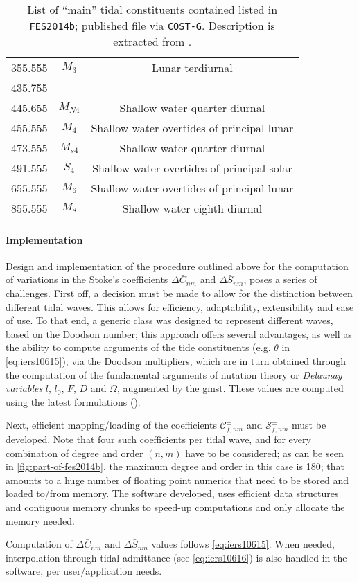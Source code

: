 \begin{table}[]
\begin{tabular}{ccc}
      355.555 & $M_3$ & Lunar terdiurnal \\
      435.755 & & \\
      445.655 & $M_{N4}$ & Shallow water quarter diurnal \\
      455.555 & $M_4$ & Shallow water overtides of principal lunar \\
      473.555 & $M_{s4}$ & Shallow water quarter diurnal \\
      491.555 & $S_4$ & Shallow water overtides of principal solar \\
      655.555 & $M_6$ & Shallow water overtides of principal lunar \\
      855.555 & $M_8$ & Shallow water eighth diurnal\\
      \hline
  \end{tabular}
  \caption{List of ``main'' tidal constituents contained listed in \texttt{FES2014b}; published 
    file via \texttt{COST-G}. Description is extracted from \cite{Beauducel2023}.}
  \label{table:tidal-constituents-fes14b}
\end{table}

\paragraph{Implementation}\label{par:ocean-tide-acceleration-implementation}
Design and implementation of the procedure outlined above for the computation of 
variations in the Stoke's coefficients $\Delta \bar{C}_{nm}$ and $\Delta \bar{S}_{nm}$, 
poses a series of challenges. First off, a decision must be made to allow for the 
distinction between different tidal waves. This allows for efficiency, adaptability, 
extensibility and ease of use. To that end, a generic class was designed to represent 
different waves, based on the Doodson number; this approach offers several advantages, 
as well as the ability to compute arguments of the tide constituents (e.g. $\theta$ 
in \autoref{eq:iers10615}), via the Doodson multipliers, which are in turn obtained 
through the computation of the fundamental arguments of nutation theory or 
\emph{Delaunay variables} $l$, $l_0$, $F$, $D$ and $\Omega$, augmented by the \gls{gmst}. 
These values are computed using the latest formulations (\cite{iers2010}).

Next, efficient mapping/loading of the coefficients $\mathcal{C}_{f,nm}^{\pm}$ and 
$\mathcal{S}_{f,nm}^{\pm}$ must be developed. Note that four such coefficients 
per tidal wave, and for every combination of degree and order $(n,m)$ have to be 
considered; as can be seen 
in \autoref{fig:part-of-fes2014b}, the maximum degree and order in this case is 180;
that amounts to a huge number of floating point numerics that need to be stored 
and loaded to/from memory. The software developed, uses efficient data structures and 
contiguous memory chunks to speed-up computations and only allocate the memory needed.

Computation of $\Delta \bar{C}_{nm}$ and $\Delta \bar{S}_{nm}$ values follows 
\autoref{eq:iers10615}. When needed, interpolation through tidal admittance (see 
\autoref{eq:iers10616}) is also handled in the software, per user/application needs. 

